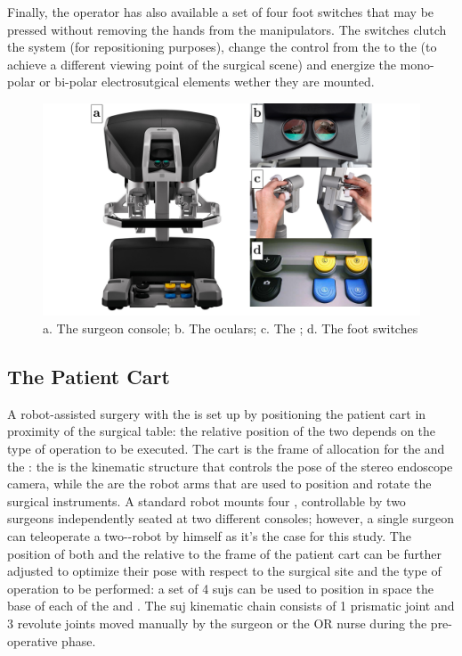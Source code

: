 \documentclass[../main.tex]{subfiles}
\begin{document}
Finally, the operator has also available a set of four foot switches that may be pressed without removing the hands from the manipulators. The switches clutch the system (for repositioning purposes), change the control from the \psms to the \ecm (to achieve a different viewing point of the surgical scene) and energize the mono-polar or bi-polar electrosutgical elements wether they are mounted.

\begin{figure}[h]
    \centering
    \includegraphics[width=\textwidth]{images/surgeon_cart_panel.png}
    \caption{a. The \davinci surgeon console; b. The \hrsv oculars; c. The \mtms; d. The foot switches}
    \label{fig:surgeonconsolepanel}
\end{figure}

\subsection{The Patient Cart}
A robot-assisted surgery with the \davinci is set up by positioning the patient cart in proximity of the surgical table: the relative position of the two depends on the type of operation to be executed. 
The cart is the frame of allocation for the \psms and the \ecm: the \ecm is the kinematic structure that controls the pose of the stereo endoscope camera, while the \psms are the robot arms that are used to position and rotate the surgical instruments. A standard \davinci robot mounts four \psms, controllable by two surgeons independently seated at two different consoles; however, a single surgeon can teleoperate a two-\psms-robot by himself as it's the case for this study.
The position of both \psms and the \ecm relative to the frame of the patient cart can be further adjusted to optimize their pose with respect to the surgical site and the type of operation to be performed: a set of 4 \acp{suj} can be used to position in space the base of each of the \psms and \ecm. The \ac{suj} kinematic chain consists of 1 prismatic joint and 3 revolute joints moved manually by the surgeon or the OR nurse during the pre-operative phase.
\end{document}
